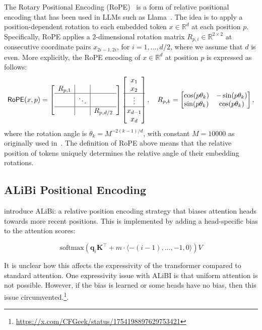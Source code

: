 The Rotary Positional Encoding (RoPE)~\citep{su2024roformer} is a form of relative positional encoding that has been used in LLMs such as Llama~\citep{touvron2023llama}.
The idea is to apply a position-dependent rotation to each embedded token \(x \in \mathbb{R}^d\) at each position \(p\).
Specifically, RoPE applies a 2-dimensional rotation matrix \(R_{p,i} \in \mathbb{R}^{2 \times 2}\) at consecutive coordinate pairs \(x_{2i-1, 2i}\), for \(i = 1, \ldots, d/2\), where we assume that \(d\) is even.
More explicitly, the RoPE encoding of \(x \in \mathbb{R}^{d}\) at position \(p\) is expressed as follows:
\begin{equation}
\mathsf{RoPE}(x, p)
    = \left[\begin{array}{c|c|c}
            R_{p,1} & & \\
            \hline
            & \ddots & \\
            \hline
            & & R_{p, d/2}
        \end{array}\right]
        \begin{bmatrix}
            x_1 \\ x_2 \\
            \hline \vdots \\
            \hline
            x_{d-1} \\ x_{d}
        \end{bmatrix},
        \quad R_{p,k} = \begin{bmatrix}
            \cos (p \theta_k) & -\sin (p \theta_k) \\
            \sin (p \theta_k) & \cos (p \theta_k)
        \end{bmatrix},
\end{equation}
where the rotation angle is \(\theta_k = M^{-2(k-1)/d}\), with constant \(M = 10000\) as originally used in~\citep{su2024roformer}.
The definition of RoPE above means that the relative position of tokens uniquely determines the relative angle of their embedding rotations.

\subsection{ALiBi Positional Encoding}

\citet{press2022train} introduce ALiBi: a relative position encoding strategy that biases attention heads towards more recent positions.
This is implemented by adding a head-specific bias to the attention scores:

\begin{equation*}
    \mathrm{softmax}\left( \mathbf q_i \mathbf K^\top + m \cdot \langle -(i-1), \ldots, -1, 0 \rangle \right)V
\end{equation*}

It is unclear how this affects the expressivity of the transformer compared to standard attention.
One expressivity issue with ALiBI is that uniform attention is not possible.
However, if the bias is learned or some heads have no bias, then this issue circumvented.\footnote{\url{https://x.com/CFGeek/status/1754198897629753421}}.

